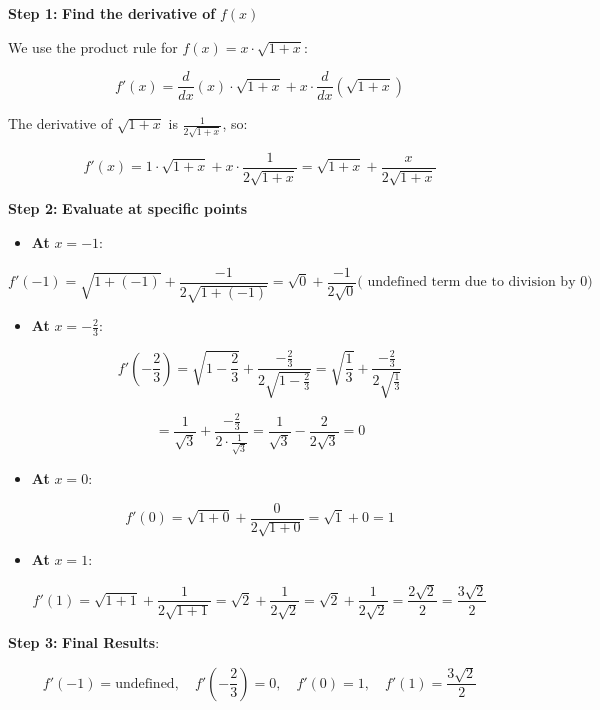 \documentclass[
]{book}
\providecommand{\tightlist}{%
  \setlength{\itemsep}{0pt}\setlength{\parskip}{0pt}}
\theoremstyle{definition}
\theoremstyle{definition}
\theoremstyle{definition}
\theoremstyle{definition}
\theoremstyle{remark}
\begin{document}
\textbf{Step 1:} \textbf{Find the derivative of} \(f(x)\)

We use the product rule for \(f(x) = x \cdot \sqrt{1+x}\):

\[
f'(x) = \frac{d}{dx} \left( x \right) \cdot \sqrt{1+x} + x \cdot \frac{d}{dx} \left( \sqrt{1+x} \right)
\]

The derivative of \(\sqrt{1+x}\) is \(\frac{1}{2\sqrt{1+x}}\), so:

\[
f'(x) = 1 \cdot \sqrt{1+x} + x \cdot \frac{1}{2\sqrt{1+x}} = \sqrt{1+x} + \frac{x}{2\sqrt{1+x}}
\]

\textbf{Step 2:} \textbf{Evaluate at specific points}

\begin{itemize}
\tightlist
\item
  \textbf{At} \(x = -1\):
\end{itemize}

\[
f'(-1) = \sqrt{1+(-1)} + \frac{-1}{2\sqrt{1+(-1)}} = \sqrt{0} + \frac{-1}{2\sqrt{0}} \text{( undefined term due to division by 0)}
\]

\begin{itemize}
\tightlist
\item
  \textbf{At} \(x = -\frac{2}{3}\):
\end{itemize}

\[
f'\left( -\frac{2}{3} \right) = \sqrt{1 - \frac{2}{3}} + \frac{-\frac{2}{3}}{2\sqrt{1-\frac{2}{3}}} = \sqrt{\frac{1}{3}} + \frac{-\frac{2}{3}}{2\sqrt{\frac{1}{3}}}
\]

\[
= \frac{1}{\sqrt{3}} + \frac{-\frac{2}{3}}{2 \cdot \frac{1}{\sqrt{3}}} = \frac{1}{\sqrt{3}} - \frac{2}{2\sqrt{3}} = 0
\]

\begin{itemize}
\tightlist
\item
  \textbf{At} \(x = 0\):
\end{itemize}

\[
f'(0) = \sqrt{1+0} + \frac{0}{2\sqrt{1+0}} = \sqrt{1} + 0 = 1
\]

\begin{itemize}
\tightlist
\item
  \textbf{At} \(x = 1\):
\end{itemize}

\[
f'(1) = \sqrt{1+1} + \frac{1}{2\sqrt{1+1}} = \sqrt{2} + \frac{1}{2\sqrt{2}} = \sqrt{2} + \frac{1}{2\sqrt{2}} = \frac{2\sqrt{2}}{2} = \frac{3\sqrt{2}}{2}
\]

\textbf{Step 3:} \textbf{Final Results}:

\[
f'(-1) = \text{undefined}, \quad f'\left( -\frac{2}{3} \right) = 0, \quad f'(0) = 1, \quad f'(1) = \frac{3\sqrt{2}}{2}
\]
\end{document}
